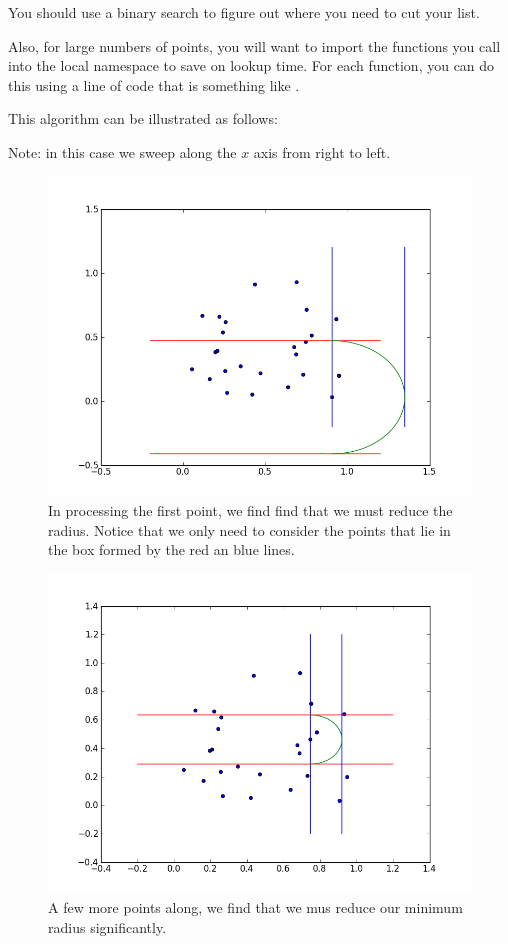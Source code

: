 You should use a binary search to figure out where you need to cut your list. 

Also, for large numbers of points, you will want to import the functions you call into the local namespace to save on lookup time. 
For each function, you can do this using a line of code that is something like . 

This algorithm can be illustrated as follows:

Note: in this case we sweep along the $x$ axis from right to left.

\begin{figure}[H]
\includegraphics[width = \textwidth]{ptsweep1.png}
\caption{In processing the first point, we find find that we must reduce the radius.
Notice that we only need to consider the points that lie in the box formed by the red an blue lines.}
\end{figure}

\begin{figure}[H]
\includegraphics[width = \textwidth]{ptsweep4.png}
\caption{A few more points along, we find that we mus reduce our minimum radius significantly.}
\end{figure}

